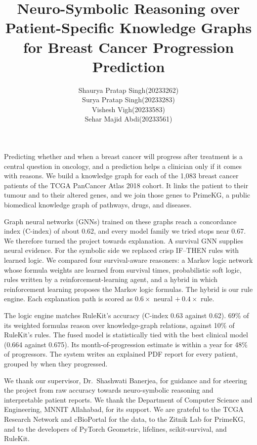 \documentclass{mnnit}
\begin{document}
\title{Neuro-Symbolic Reasoning over Patient-Specific Knowledge Graphs for Breast Cancer Progression Prediction}
\author{\begin{tabular}{ll}
Shaurya Pratap Singh & (20233262)\\
Surya Pratap Singh & (20233283)\\
Vishesh Vigh & (20233583)\\
Sehar Majid Abdi & (20233561)
\end{tabular}}

\beforepreface

Predicting whether and when a breast cancer will progress after treatment is a central question in oncology, and a
prediction helps a clinician only if it comes with reasons. We build a knowledge graph for each of the 1,083 breast
cancer patients of the TCGA PanCancer Atlas 2018 cohort. It links the patient to their tumour and to their altered genes,
and we join those genes to PrimeKG, a public biomedical knowledge graph of pathways, drugs, and diseases.

Graph neural networks (GNNs) trained on these graphs reach a concordance index (C-index) of about 0.62, and every model
family we tried stops near 0.67. We therefore turned the project towards explanation. A survival GNN supplies neural
evidence. For the symbolic side we replaced crisp IF--THEN rules with learned logic. We compared four survival-aware
reasoners: a Markov logic network whose formula weights are learned from survival times, probabilistic soft logic,
rules written by a reinforcement-learning agent, and a hybrid in which reinforcement learning proposes the Markov logic
formulas. The hybrid is our rule engine. Each explanation path is scored as $0.6\times$ neural $+\ 0.4\times$ rule.

The logic engine matches RuleKit's accuracy (C-index 0.63 against 0.62). 69\% of its weighted formulas reason over
knowledge-graph relations, against 10\% of RuleKit's rules. The fused model is statistically tied with the best
clinical model (0.664 against 0.675). Its month-of-progression estimate is within a year for 48\% of progressors. The
system writes an explained PDF report for every patient, grouped by when they progressed.

We thank our supervisor, Dr.\ Shashwati Banerjea, for guidance and for steering the project from raw accuracy
towards neuro-symbolic reasoning and interpretable patient reports. We thank the Department of Computer Science and
Engineering, MNNIT Allahabad, for its support. We are grateful to the TCGA Research Network and cBioPortal for the data,
to the Zitnik Lab for PrimeKG, and to the developers of PyTorch Geometric, lifelines, scikit-survival, and RuleKit.
\end{document}
